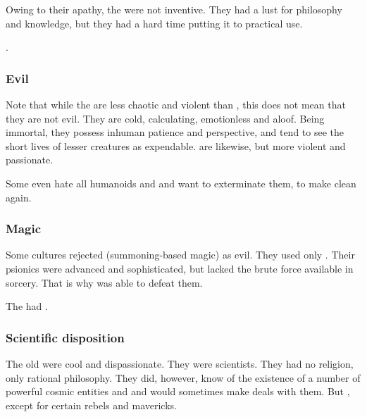 Owing to their apathy, the \quiljaaran were not inventive. 
They had a lust for philosophy and knowledge, but they had a hard time putting it to practical use. 

. 





\subsubsection{Evil}
Note that while the \ophidians{} are less chaotic and violent than \dragons, this does not mean that they are not evil. 
They are cold, calculating, emotionless and aloof. 
Being immortal, they possess inhuman patience and perspective, and tend to see the short lives of lesser creatures as expendable. 
\Dragons{} are likewise, but more violent and passionate. 


Some \trueophidians{} even hate all humanoids and \dragons{} and want to exterminate them, to make \Miith{} clean again.





\subsubsection{Magic}
Some \ophidian{} cultures rejected  (summoning-based magic) as evil. 
They used only . 
Their psionics were advanced and sophisticated, but lacked the brute force available in sorcery. 
That is why  was able to defeat them. 

The {\quiljaaran} had . 





\subsubsection{Scientific disposition}
The old \ophidians{} were cool and dispassionate. 
They were scientists. 
They had no religion, only rational philosophy. 
They did, however, know of the existence of a number of powerful cosmic entities and  and would sometimes make deals with them. 
But , except for certain rebels and mavericks. 

